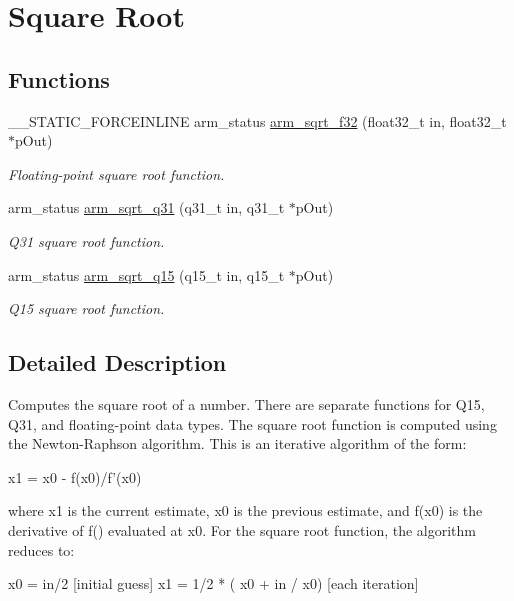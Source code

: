 \hypertarget{group___s_q_r_t}{}\section{Square Root}
\label{group___s_q_r_t}
\subsection*{Functions}
\begin{DoxyCompactItemize}
\item 
\+\_\+\+\_\+\+S\+T\+A\+T\+I\+C\+\_\+\+F\+O\+R\+C\+E\+I\+N\+L\+I\+NE arm\+\_\+status \mbox{\hyperlink{group___s_q_r_t_ga5f37f479666ee8ff9711b334286c60ed}{arm\+\_\+sqrt\+\_\+f32}} (float32\+\_\+t in, float32\+\_\+t $\ast$p\+Out)
\begin{DoxyCompactList}\small\item\em Floating-\/point square root function. \end{DoxyCompactList}\item 
arm\+\_\+status \mbox{\hyperlink{group___s_q_r_t_ga119e25831e141d734d7ef10636670058}{arm\+\_\+sqrt\+\_\+q31}} (q31\+\_\+t in, q31\+\_\+t $\ast$p\+Out)
\begin{DoxyCompactList}\small\item\em Q31 square root function. \end{DoxyCompactList}\item 
arm\+\_\+status \mbox{\hyperlink{group___s_q_r_t_ga5abe5ca724f3e15849662b03752c1238}{arm\+\_\+sqrt\+\_\+q15}} (q15\+\_\+t in, q15\+\_\+t $\ast$p\+Out)
\begin{DoxyCompactList}\small\item\em Q15 square root function. \end{DoxyCompactList}\end{DoxyCompactItemize}


\subsection{Detailed Description}
Computes the square root of a number. There are separate functions for Q15, Q31, and floating-\/point data types. The square root function is computed using the Newton-\/\+Raphson algorithm. This is an iterative algorithm of the form\+: 
\begin{DoxyPre}
     x1 = x0 - f(x0)/f'(x0)
\end{DoxyPre}
 where {\ttfamily x1} is the current estimate, {\ttfamily x0} is the previous estimate, and {\ttfamily f\textquotesingle{}(x0)} is the derivative of {\ttfamily f()} evaluated at {\ttfamily x0}. For the square root function, the algorithm reduces to\+: 
\begin{DoxyPre}
    x0 = in/2                         [initial guess]
    x1 = 1/2 * ( x0 + in / x0)        [each iteration]
\end{DoxyPre}
 

